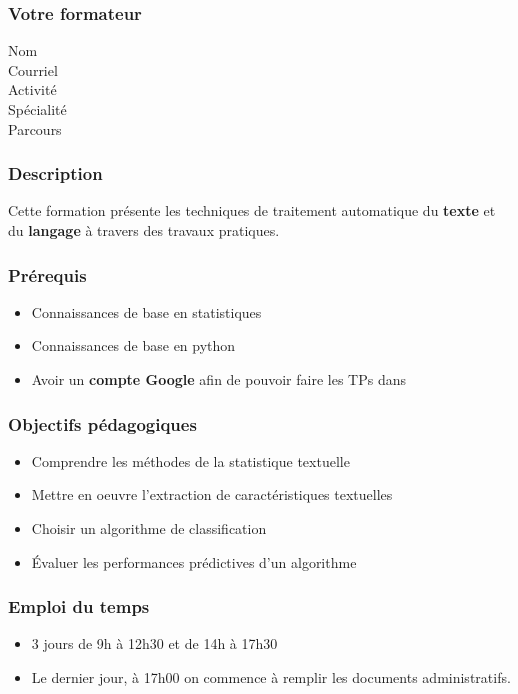 \begin{frame}
  \frametitle{Votre formateur}
  \begin{description}
  \item[Nom] \TrainerName
  \item[Courriel] \TrainerEmail
  \item[Activité] \TrainerActivity
  \item[Spécialité] \TrainerSpecialization
  \item[Parcours] \TrainerTraining
  \end{description}
\end{frame}

\begin{frame}
  \frametitle{Description}
  Cette formation présente les techniques de traitement automatique du 
  \textbf{texte} et du \textbf{langage} à travers des travaux pratiques.
\end{frame}

\begin{frame}
  \frametitle{Prérequis}
  \begin{itemize}
  \item Connaissances de base en statistiques
  \item Connaissances de base en python
  \item Avoir un \textbf{compte Google} afin de pouvoir faire les TPs dans 
  \end{itemize}
\end{frame}

\begin{frame}
  \frametitle{Objectifs pédagogiques}
  \begin{itemize}
  \item Comprendre les méthodes de la statistique textuelle
  \item Mettre en oeuvre l'extraction de caractéristiques textuelles
  \item Choisir un algorithme de classification
  \item Évaluer les performances prédictives d'un algorithme
  \end{itemize}
\end{frame}

\begin{frame}
  \frametitle{Emploi du temps}
  \begin{itemize}
  \item 3 jours de 9h à 12h30 et de 14h à 17h30
  \item Le dernier jour, à 17h00 on commence à remplir les documents administratifs.
  \end{itemize}
\end{frame}

